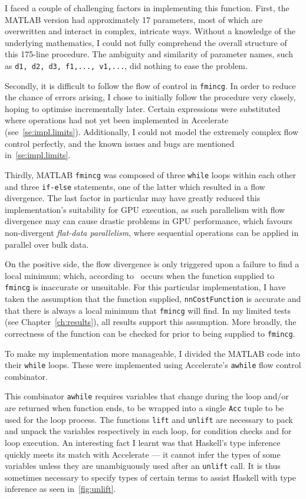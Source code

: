 I faced a couple of challenging factors in implementing this function. First, the MATLAB version had approximately 17 parameters, most of which are overwritten and interact in complex, intricate ways. Without a knowledge of the underlying mathematics, I could not fully comprehend the overall structure of this 175-line procedure. The ambiguity and similarity of parameter names, such as \texttt{d1, d2, d3, f1,..., v1,...}, did nothing to ease the problem. 

Secondly, it is difficult to follow the flow of control in \texttt{fmincg}. In order to reduce the chance of errors arising, I chose to initially follow the procedure very closely, hoping to optimise incrementally later. Certain expressions were substituted where operations had not yet been implemented in Accelerate (see~\ref{se:impl.limits}). Additionally, I could not model the extremely complex flow control perfectly, and the known issues and bugs are mentioned in~\ref{se:impl.limits}.

Thirdly, MATLAB \texttt{fmincg} was composed of three \texttt{while} loops within each other and three \texttt{if-else} statements, one of the latter which resulted in a flow divergence. The last factor in particular may have greatly reduced this implementation's suitability for GPU execution, as such parallelism with flow divergence may can cause drastic problems in GPU performance, which favours non-divergent \emph{flat-data parallelism}, where sequential operations can be applied in parallel over bulk data.

On the positive side, the flow divergence is only triggered upon a failure to find a local minimum; which, according to~\cite{Reb13} occurs when the function supplied to \texttt{fmincg} is inaccurate or unsuitable. For this particular implementation, I have taken the assumption that the function supplied, \texttt{nnCostFunction} is accurate and that there is always a local minimum that \texttt{fmincg} will find. In my limited tests (see Chapter~\ref{ch:results}), all results support this assumption. More broadly, the correctness of the function can be checked for prior to being supplied to \texttt{fmincg}.

To make my implementation more manageable, I divided the MATLAB code into their \texttt{while} loops. These were implemented using Accelerate's \texttt{awhile} flow control combinator. 

This combinator \texttt{awhile} requires variables that change during the loop and/or are returned when function ends, to be wrapped into a single \texttt{Acc} tuple to be used for the loop process. The functions \texttt{lift} and \texttt{unlift} are necessary to pack and unpack the variables respectively in each loop, for condition checks and for loop execution. An interesting fact I learnt was that Haskell's type inference quickly meets its match with Accelerate --- it cannot infer the types of some variables unless they are unambiguously used after an \texttt{unlift} call. It is thus sometimes necessary to specify types of certain terms to assist Haskell with type inference as seen in~\ref{fig:unlift}.


